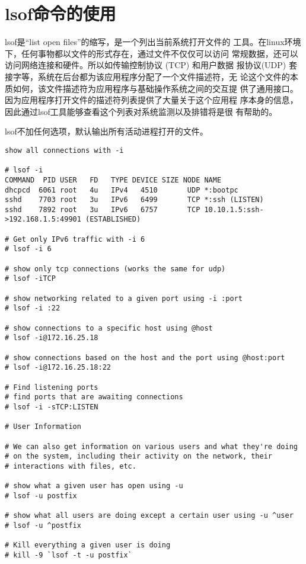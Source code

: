 \section{lsof命令的使用}
\label{sec:lsofCmd}

lsof是“list open files”的缩写，是一个列出当前系统打开文件的
工具。在linux环境下，任何事物都以文件的形式存在，通过文件不仅仅可以访问
常规数据，还可以访问网络连接和硬件。所以如传输控制协议 (TCP) 和用户数据
报协议(UDP) 套接字等，系统在后台都为该应用程序分配了一个文件描述符，无
论这个文件的本质如何，该文件描述符为应用程序与基础操作系统之间的交互提
供了通用接口。因为应用程序打开文件的描述符列表提供了大量关于这个应用程
序本身的信息，因此通过lsof工具能够查看这个列表对系统监测以及排错将是很
有帮助的。

lsof不加任何选项，默认输出所有活动进程打开的文件。

\begin{verbatim}
show all connections with -i

# lsof -i
COMMAND  PID USER   FD   TYPE DEVICE SIZE NODE NAME
dhcpcd  6061 root   4u   IPv4   4510       UDP *:bootpc
sshd    7703 root   3u   IPv6   6499       TCP *:ssh (LISTEN)
sshd    7892 root   3u   IPv6   6757       TCP 10.10.1.5:ssh->192.168.1.5:49901 (ESTABLISHED)

# Get only IPv6 traffic with -i 6
# lsof -i 6

# show only tcp connections (works the same for udp)
# lsof -iTCP

# show networking related to a given port using -i :port
# lsof -i :22

# show connections to a specific host using @host
# lsof -i@172.16.25.18

# show connections based on the host and the port using @host:port
# lsof -i@172.16.25.18:22

# Find listening ports
# find ports that are awaiting connections
# lsof -i -sTCP:LISTEN

# User Information

# We can also get information on various users and what they're doing
# on the system, including their activity on the network, their
# interactions with files, etc.

# show what a given user has open using -u
# lsof -u postfix

# show what all users are doing except a certain user using -u ^user
# lsof -u ^postfix

# Kill everything a given user is doing
# kill -9 `lsof -t -u postfix`
\end{verbatim}

